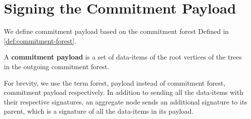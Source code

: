 \section{Signing the Commitment Payload}
		We define commitment payload based on the commitment forest Defined in \ref{def:commitment-forest}.
	\begin{definition}
		A \textbf{commitment payload} is a set of data-items of the root vertices of the trees in the outgoing commitment forest.
	\end{definition}
	For brevity, we use the term forest, payload instead of commitment forest, commitment payload respectively.
	In addition to sending all the data-items with their respective signatures, an aggregate node sends an additional signature to its parent, which is a signature of all the data-items in its payload.
